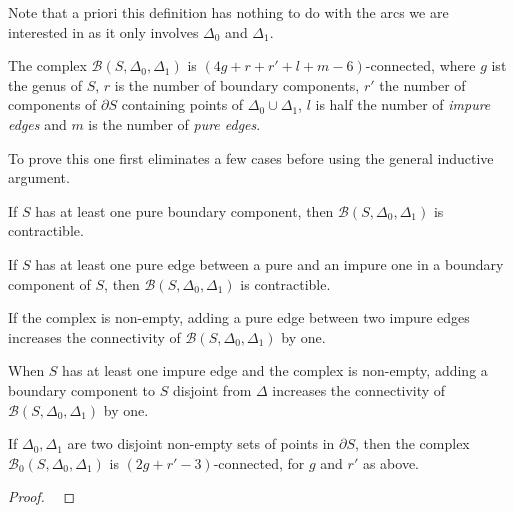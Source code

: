 Note that a priori this definition has nothing to do with the arcs we are interested in as it only involves $\Delta_0$ and $\Delta_1$. 

\begin{theorem}
	The complex $\mathcal{B}(S,\Delta_0,\Delta_1)$ is $(4g +r +r ' +l +m -6)$-connected, where $g$ ist the genus of $S$, $r$ is the number of boundary components, $r'$ the number of components of $\partial S$ containing points of $\Delta_0 \cup \Delta_1$, $l$ is half the number of \emph{impure edges} and $m$ is the number of \emph{pure edges}.
\end{theorem}

To prove this one first eliminates a few cases before using the general inductive argument.


\begin{lemma}
	If $S$ has at least one pure boundary component, then $\mathcal{B}(S,\Delta_0,\Delta_1)$ is contractible.
\end{lemma}

\begin{lemma}
	If $S$ has at least one pure edge between a pure and an impure one in a boundary component of $S$, then $\mathcal{B}(S,\Delta_0,\Delta_1)$ is contractible.
\end{lemma}

\begin{lemma}
	If the complex is non-empty, adding a pure edge between two impure edges increases the connectivity of $\mathcal{B}(S,\Delta_0,\Delta_1)$ by one.
\end{lemma}

\begin{lemma}
	When $S$ has at least one impure edge and the complex is non-empty, adding a boundary component to $S$ disjoint from $\Delta$ increases the connectivity of $\mathcal{B}(S,\Delta_0,\Delta_1)$ by one.
\end{lemma}

\begin{theorem}
	If $\Delta_0, \Delta_1$ are two disjoint non-empty sets of points in $\partial S$, then the complex $\mathcal{B}_0(S,\Delta_0,\Delta_1)$ is $(2g+r'-3)$-connected, for $g$ and $r'$ as above.
\end{theorem}


\connectivity*
\begin{proof}
	\mbox{ }
\end{proof}